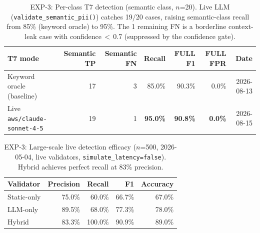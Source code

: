 \begin{table}[t]
\centering
\small
\caption{EXP-3: Per-class T7 detection (semantic class, $n$=20).
  Live LLM (\texttt{validate\_semantic\_pii()}) catches 19/20 cases, raising
  semantic-class recall from 85\% (keyword oracle) to 95\%.
  The 1 remaining FN is a borderline context-leak case with
  confidence\,$<$\,0.7 (suppressed by the confidence gate).}
\label{tab:exp3-semantic}
\begin{tabular}{lrrrrrr}
\hline
\textbf{T7 mode} & \textbf{Semantic TP} & \textbf{Semantic FN} & \textbf{Recall} & \textbf{FULL F1} & \textbf{FULL FPR} & \textbf{Date} \\
\hline
Keyword oracle (baseline) & 17 & 3 & 85.0\% & 90.3\% & 0.0\% & 2026-08-13 \\
Live \texttt{aws/claude-sonnet-4-5} & 19 & 1 & \textbf{95.0\%} & \textbf{90.8\%} & \textbf{0.0\%} & 2026-08-15 \\
\hline
\end{tabular}
\end{table}

\begin{table}[t]
\centering
\small
\caption{EXP-3: Large-scale live detection efficacy ($n$=500, 2026-05-04,
  live validators, \texttt{simulate\_latency=false}).
  Hybrid achieves perfect recall at 83\% precision.}
\label{tab:exp3-live500}
\begin{tabular}{lrrrr}
\hline
\textbf{Validator} & \textbf{Precision} & \textbf{Recall} & \textbf{F1} & \textbf{Accuracy} \\
\hline
Static-only & 75.0\% & 60.0\% & 66.7\% & 67.0\% \\
LLM-only    & 89.5\% & 68.0\% & 77.3\% & 78.0\% \\
Hybrid      & 83.3\% &100.0\% & 90.9\% & 89.0\% \\
\hline
\end{tabular}
\end{table}

